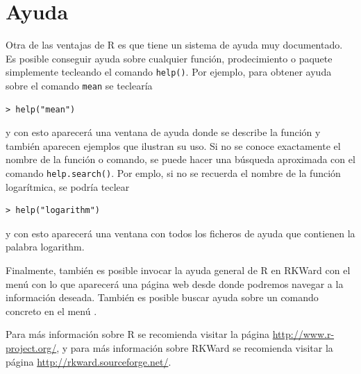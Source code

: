\section{Ayuda}
Otra de las ventajas de R es que tiene un sistema de ayuda muy documentado. Es posible conseguir ayuda sobre cualquier
función, prodecimiento o paquete simplemente tecleando el comando \lstinline{help()}. Por ejemplo, para obtener ayuda
sobre el comando \lstinline{mean} se teclearía
\begin{lstlisting}
> help("mean")
\end{lstlisting}
y con esto aparecerá una ventana de ayuda donde se describe la función y también aparecen ejemplos que ilustran su uso. 
Si no se conoce exactamente el nombre de la función o comando, se puede hacer una búsqueda aproximada con el comando
\lstinline{help.search()}. Por emplo, si no se recuerda el nombre de la función logarítmica, se podría
teclear
\begin{lstlisting}
> help("logarithm")
\end{lstlisting}
y con esto aparecerá una ventana con todos los ficheros de ayuda que contienen la palabra logarithm.

Finalmente, también es posible invocar la ayuda general de R en RKWard con el menú  con lo
que aparecerá una página web desde donde podremos navegar a la información deseada. También es posible buscar ayuda
sobre un comando concreto en el menú .

Para más información sobre R se recomienda visitar la página \url{http://www.r-project.org/}, y para más información
sobre RKWard se recomienda visitar la página \url{http://rkward.sourceforge.net/}. 

\clearpage
\newpage

